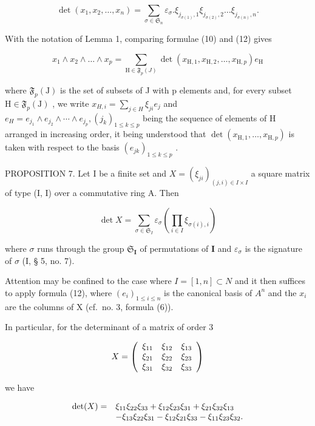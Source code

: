 \[
\det (x _ {1}, x _ {2}, \dots , x _ {n}) = \sum_ {\sigma \in \mathfrak {S} _ {n}} \varepsilon_ {\sigma}. \xi_ {j _ {\sigma (1)}, 1} \xi_ {j _ {\sigma (2)}, 2} \dots \xi_ {j _ {\sigma (n)}, n}.\tag{12}
\]

With the notation of Lemma 1, comparing formulae (10) and (12) gives

\[
x _ {1} \wedge x _ {2} \wedge \dots \wedge x _ {p} = \sum_ {\mathrm{H} \in \mathfrak {F} _ {p} (J)} \det (x _ {\mathrm{H}, 1}, x _ {\mathrm{H}, 2}, \dots , x _ {\mathrm{H}, p}) e _ {\mathrm{H}}\tag{13}
\]

where \(\mathfrak{F}_{p}(\mathrm{J})\) is the set of subsets of J with p elements and, for every subset \(\mathrm{H}\in\mathfrak{F}_{p}(\mathrm{J})\) , we write \(x_{H,i}=\sum_{j\in H}\xi_{ji}e_{j}\) and \(e_{H}=e_{j_{1}}\wedge e_{j_{2}}\wedge\cdots\wedge e_{j_{p}},(j_{k})_{1\leqslant k\leqslant p}\) being the sequence of elements of H arranged in increasing order, it being understood that \(\det(x_{\mathrm{H},1},\ldots,x_{\mathrm{H},p})\) is taken with respect to the basis \((e_{jk})_{1\leqslant k\leqslant p}\) .

PROPOSITION 7. Let I be a finite set and \(X = (\xi_{ji})_{(j, i) \in I \times I}\) a square matrix of type (I, I) over a commutative ring A. Then

\[
\det X = \sum_ {\sigma \in \mathfrak {S} _ {I}} \varepsilon_ {\sigma} \left(\prod_ {i \in I} \xi_ {\sigma (i), i}\right)\tag{14}
\]

where \(\sigma\) runs through the group \(\mathfrak{S}_{\mathbf{I}}\) of permutations of \(\mathbf{I}\) and \(\varepsilon_{\sigma}\) is the signature of \(\sigma\) (I, § 5, no. 7).

Attention may be confined to the case where \(I = [1, n] \subset N\) and it then suffices to apply formula (12), where \((e_{i})_{1 \leqslant i \leqslant n}\) is the canonical basis of \(A^{n}\) and the \(x_{i}\) are the columns of X (cf.~no. 3, formula (6)).

In particular, for the determinant of a matrix of order 3

\[
X = \left( \begin{array}{c c c} \xi_ {1 1} & \xi_ {1 2} & \xi_ {1 3} \\ \xi_ {2 1} & \xi_ {2 2} & \xi_ {2 3} \\ \xi_ {3 1} & \xi_ {3 2} & \xi_ {3 3} \end{array} \right)
\]

we have

\[
\begin{array}{r l} \det (X) = & \xi_ {1 1} \xi_ {2 2} \xi_ {3 3} + \xi_ {1 2} \xi_ {2 3} \xi_ {3 1} + \xi_ {2 1} \xi_ {3 2} \xi_ {1 3} \\ & - \xi_ {1 3} \xi_ {2 2} \xi_ {3 1} - \xi_ {1 2} \xi_ {2 1} \xi_ {3 3} - \xi_ {1 1} \xi_ {2 3} \xi_ {3 2}. \end{array}
\]

